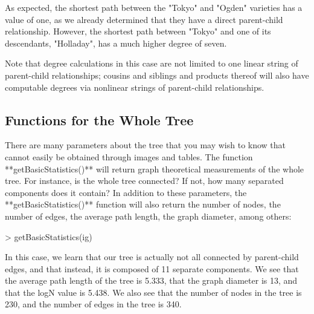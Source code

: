 \documentclass{article}
\numberwithin{equation}{section} %
\begin{document}
As expected, the shortest path between the "Tokyo" and "Ogden" varieties has a value of one, as we already determined that they have a direct parent-child relationship. However, the shortest path between "Tokyo" and one of its descendants, "Holladay", has a much higher degree of seven.

Note that degree calculations in this case are not limited to one linear string of parent-child relationships; cousins and siblings and products thereof will also have computable degrees via nonlinear strings of parent-child relationships.

\subsection{Functions for the Whole Tree}

There are many parameters about the tree that you may wish to know that cannot easily be obtained through images and tables. The function **getBasicStatistics()** will return graph theoretical measurements of the whole tree. For instance, is the whole tree connected? If not, how many separated components does it contain? In addition to these parameters, the **getBasicStatistics()** function will also return the number of nodes, the number of edges, the average path length, the graph diameter, among others:

\begin{Schunk}
\begin{Sinput}
> getBasicStatistics(ig)
\end{Sinput}
\end{Schunk}

In this case, we learn that our tree is actually not all connected by parent-child edges, and that instead, it is composed of 11 separate components. We see that the average path length of the tree is 5.333, that the graph diameter is 13, and that the logN value is 5.438. We also see that the number of nodes in the tree is 230, and the number of edges in the tree is 340.
\end{document}
